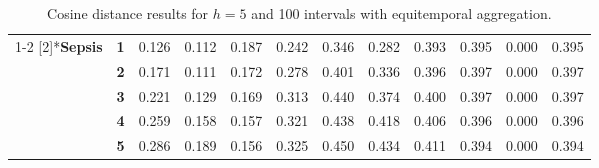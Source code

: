 \begin{table}[htbp]
{\begin{tabular}{|cl|rrrrrrrrrr|}
\cmidrule{1-2}    \multirow{5}[2]{*}{\textbf{Sepsis}} & \textbf{1} & \cellcolor[rgb]{ .796,  .796,  .796}0.126 & \cellcolor[rgb]{ .804,  .804,  .804}0.112 & \cellcolor[rgb]{ .769,  .769,  .769}0.187 & \cellcolor[rgb]{ .745,  .745,  .745}0.242 & \cellcolor[rgb]{ .698,  .698,  .698}0.346 & \cellcolor[rgb]{ .729,  .729,  .729}0.282 & \cellcolor[rgb]{ .678,  .678,  .678}0.393 & \cellcolor[rgb]{ .678,  .678,  .678}0.395 & \cellcolor[rgb]{ .851,  .851,  .851}0.000 & \cellcolor[rgb]{ .678,  .678,  .678}0.395 \\
          & \textbf{2} & \cellcolor[rgb]{ .776,  .776,  .776}0.171 & \cellcolor[rgb]{ .804,  .804,  .804}0.111 & \cellcolor[rgb]{ .776,  .776,  .776}0.172 & \cellcolor[rgb]{ .729,  .729,  .729}0.278 & \cellcolor[rgb]{ .675,  .675,  .675}0.401 & \cellcolor[rgb]{ .702,  .702,  .702}0.336 & \cellcolor[rgb]{ .678,  .678,  .678}0.396 & \cellcolor[rgb]{ .678,  .678,  .678}0.397 & \cellcolor[rgb]{ .851,  .851,  .851}0.000 & \cellcolor[rgb]{ .678,  .678,  .678}0.397 \\
          & \textbf{3} & \cellcolor[rgb]{ .753,  .753,  .753}0.221 & \cellcolor[rgb]{ .796,  .796,  .796}0.129 & \cellcolor[rgb]{ .776,  .776,  .776}0.169 & \cellcolor[rgb]{ .714,  .714,  .714}0.313 & \cellcolor[rgb]{ .659,  .659,  .659}0.440 & \cellcolor[rgb]{ .686,  .686,  .686}0.374 & \cellcolor[rgb]{ .675,  .675,  .675}0.400 & \cellcolor[rgb]{ .678,  .678,  .678}0.397 & \cellcolor[rgb]{ .851,  .851,  .851}0.000 & \cellcolor[rgb]{ .678,  .678,  .678}0.397 \\
          & \textbf{4} & \cellcolor[rgb]{ .737,  .737,  .737}0.259 & \cellcolor[rgb]{ .784,  .784,  .784}0.158 & \cellcolor[rgb]{ .784,  .784,  .784}0.157 & \cellcolor[rgb]{ .71,  .71,  .71}0.321 & \cellcolor[rgb]{ .659,  .659,  .659}0.438 & \cellcolor[rgb]{ .667,  .667,  .667}0.418 & \cellcolor[rgb]{ .675,  .675,  .675}0.406 & \cellcolor[rgb]{ .678,  .678,  .678}0.396 & \cellcolor[rgb]{ .851,  .851,  .851}0.000 & \cellcolor[rgb]{ .678,  .678,  .678}0.396 \\
          & \textbf{5} & \cellcolor[rgb]{ .725,  .725,  .725}0.286 & \cellcolor[rgb]{ .769,  .769,  .769}0.189 & \cellcolor[rgb]{ .784,  .784,  .784}0.156 & \cellcolor[rgb]{ .71,  .71,  .71}0.325 & \cellcolor[rgb]{ .651,  .651,  .651}0.450 & \cellcolor[rgb]{ .659,  .659,  .659}0.434 & \cellcolor[rgb]{ .671,  .671,  .671}0.411 & \cellcolor[rgb]{ .678,  .678,  .678}0.394 & \cellcolor[rgb]{ .851,  .851,  .851}0.000 & \cellcolor[rgb]{ .678,  .678,  .678}0.394 \\
    \bottomrule
    \end{tabular}
    }
  \caption{Cosine distance results for $h=5$ and 100 intervals with equitemporal  aggregation.}
  \label{tab:equitemp_100}%
\end{table}%
